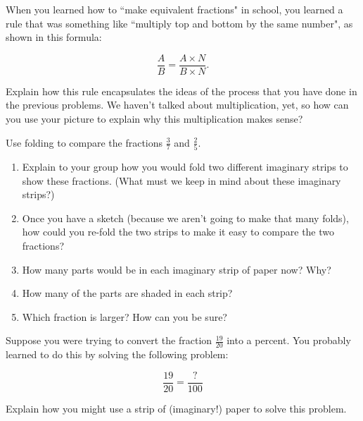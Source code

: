 \documentclass{ximera}
\begin{document}
\begin{problem}
When you learned how to ``make equivalent fractions" in school, you learned a rule that was something like ``multiply top and bottom by the same number", as shown in this formula:

  \[ \frac{A}{B} = \frac{A \times N}{B \times N}. \]

Explain how this rule encapsulates the ideas of the process that you have done in the previous problems. We haven't talked about multiplication, yet, so how can you use your picture to explain why this multiplication makes sense?  %
\end{problem}

\newpage

\begin{problem}
 Use folding to compare the fractions $\frac{3}{7}$ and $\frac{2}{5}$. 
\begin{enumerate}
    \item Explain to your group how you would fold two different imaginary strips to show these fractions. (What must we keep in mind about these imaginary strips?)   
    \item Once you have a sketch (because we aren't going to make that many folds), how could you re-fold the two strips to make it easy to compare the two fractions? 
   \item How many parts would be in each imaginary strip of paper now? Why?
    \item   How many of the parts are shaded in each strip?
    \item   Which fraction is larger?  How can you be sure? 
\end{enumerate}
\end{problem}

\begin{problem}
Suppose you were trying to convert the fraction $\frac{19}{20}$ into a percent.  You probably learned to do this by solving the following problem:

\[ \frac{19}{20} = \frac{?}{100} \]

Explain how you might use a strip of (imaginary!) paper  to solve this problem.
\end{problem}





\newpage
\end{document}
